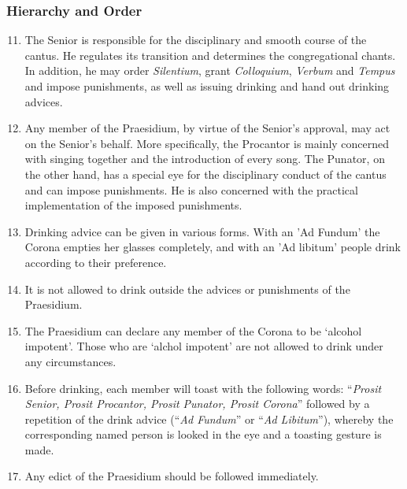 \subsubsection*{Hierarchy and Order}
\begin{enumerate}
    \setcounter{enumi}{10}
    \item The Senior is responsible for the disciplinary and smooth course of the cantus. He regulates its transition and determines the congregational chants. In addition, he may order \textit{Silentium}, grant \textit{Colloquium}, \textit{Verbum} and \textit{Tempus} and impose punishments, as well as issuing drinking and hand out drinking advices.
    \item Any member of the Praesidium, by virtue of the Senior's approval, may act on the Senior's behalf. More specifically, the Procantor is mainly concerned with singing together and the introduction of every song. The Punator, on the other hand, has a special eye for the disciplinary conduct of the cantus and can impose punishments. He is also concerned with the practical implementation of the imposed punishments.
    \item Drinking advice can be given in various forms. With an 'Ad Fundum' the Corona empties her glasses completely, and with an 'Ad libitum' people drink according to their preference.
    \item It is not allowed to drink outside the advices or punishments of the Praesidium.
    \item The Praesidium can declare any member of the Corona to be `alcohol impotent'. Those who are `alchol impotent' are not allowed to drink under any circumstances.
    \item Before drinking, each member will toast with the following words: ``\textit{Prosit Senior, Prosit Procantor, Prosit Punator, Prosit Corona}'' followed by a repetition of the drink advice (``\textit{Ad Fundum}'' or ``\textit{Ad Libitum}''), whereby the corresponding named person is looked in the eye and a toasting gesture is made.
    \item Any edict of the Praesidium should be followed immediately.
\end{enumerate}


